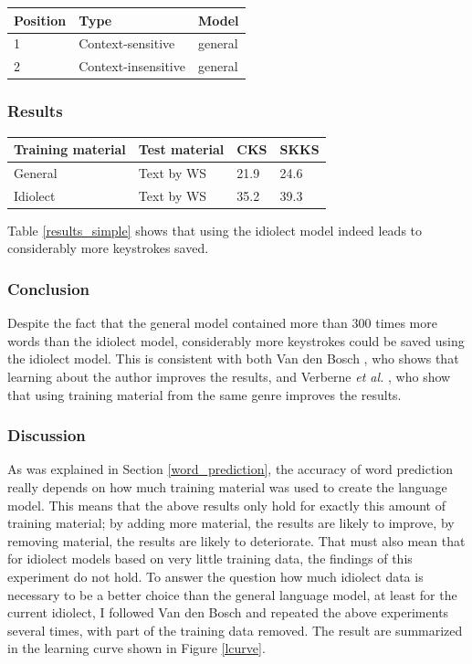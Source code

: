 \documentclass[11pt]{article}
\let\originaltable\table
\let\endoriginaltable\endtable
\renewenvironment{table}[1][ht]{%
  \originaltable[#1]
  \centering}%
  {\endoriginaltable}
\begin{document}
\begin{table}[H]
\begin{tabular}{lll} 
Position&Type&Model\\
\hline
1&Context-sensitive&general\\
2&Context-insensitive&general\\
\end{tabular} 
\caption{Module order for a simulation for the general model.} \label{generalmodel_setup} 
\end{table}


\subsubsection{Results}

\begin{table}[H]
\begin{tabular}{ll|ll} 
Training material&Test material&CKS&SKKS\\
\hline
General &Text by WS&21.9&24.6\\
Idiolect&Text by WS&35.2&39.3\\
\end{tabular} 
\caption{Percentage of keystrokes that can be saved when using the general and the idiolect model} \label{results_simple}
\end{table}

Table \ref{results_simple} shows that  using the idiolect model indeed leads to considerably more keystrokes saved. 

\subsubsection{Conclusion}
Despite the fact that the general model contained more than 300 times more words than the idiolect model, considerably more keystrokes could be saved using the idiolect model. This is consistent with both Van den Bosch , who shows that learning about the author improves the results, and Verberne {\em et al.} , who show that using training material from the same genre improves the results.

\subsubsection{Discussion}
As was explained in Section \ref{word_prediction}, the accuracy of word prediction really depends on how much training material was used to create the language model. This means that the above results only hold for exactly this amount of training material; by adding more material, the results are likely to improve, by removing material, the results are likely to deteriorate. That must also mean that for idiolect models based on very little training data, the findings of this experiment do not hold. To answer the question how much idiolect data is necessary to be a better choice than the general language model, at least for the current idiolect, I followed Van den Bosch  and repeated the above experiments several times, with part of the training data removed. The result are summarized in the learning curve shown in Figure \ref{lcurve}.
\end{document}

